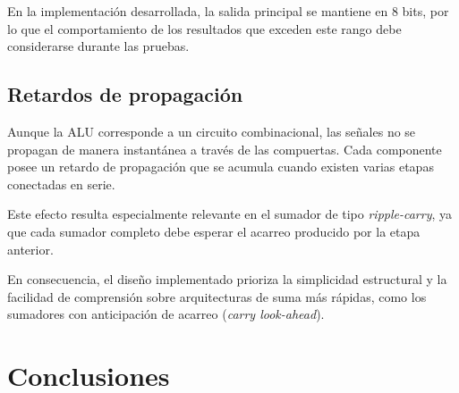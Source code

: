 \documentclass[12pt,a4paper]{article}
\begin{document}
En la implementación desarrollada, la salida principal se mantiene en 8 bits, por lo que el comportamiento de los resultados que exceden este rango debe considerarse durante las pruebas.

\subsection{Retardos de propagación}

Aunque la ALU corresponde a un circuito combinacional, las señales no se propagan de manera instantánea a través de las compuertas. Cada componente posee un retardo de propagación que se acumula cuando existen varias etapas conectadas en serie.

Este efecto resulta especialmente relevante en el sumador de tipo \textit{ripple-carry}, ya que cada sumador completo debe esperar el acarreo producido por la etapa anterior.

En consecuencia, el diseño implementado prioriza la simplicidad estructural y la facilidad de comprensión sobre arquitecturas de suma más rápidas, como los sumadores con anticipación de acarreo (\textit{carry look-ahead}).

\section{Conclusiones}
\end{document}
